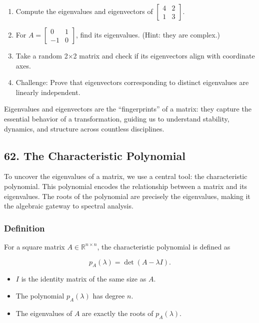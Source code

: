 \documentclass[
  letterpaper,
  DIV=11,
  numbers=noendperiod]{scrreprt}
\providecommand{\tightlist}{%
  \setlength{\itemsep}{0pt}\setlength{\parskip}{0pt}}
\begin{document}
\begin{enumerate}
\def\labelenumi{\arabic{enumi}.}
\tightlist
\item
  Compute the eigenvalues and eigenvectors of
  \(\begin{bmatrix} 4 & 2 \\ 1 & 3 \end{bmatrix}\).
\item
  For \(A = \begin{bmatrix} 0 & 1 \\ -1 & 0 \end{bmatrix}\), find its
  eigenvalues. (Hint: they are complex.)
\item
  Take a random 2×2 matrix and check if its eigenvectors align with
  coordinate axes.
\item
  Challenge: Prove that eigenvectors corresponding to distinct
  eigenvalues are linearly independent.
\end{enumerate}

Eigenvalues and eigenvectors are the ``fingerprints'' of a matrix: they
capture the essential behavior of a transformation, guiding us to
understand stability, dynamics, and structure across countless
disciplines.

\subsection{62. The Characteristic
Polynomial}\label{the-characteristic-polynomial}

To uncover the eigenvalues of a matrix, we use a central tool: the
characteristic polynomial. This polynomial encodes the relationship
between a matrix and its eigenvalues. The roots of the polynomial are
precisely the eigenvalues, making it the algebraic gateway to spectral
analysis.

\subsubsection{Definition}\label{definition-3}

For a square matrix \(A \in \mathbb{R}^{n \times n}\), the
characteristic polynomial is defined as

\[
p_A(\lambda) = \det(A - \lambda I).
\]

\begin{itemize}
\tightlist
\item
  \(I\) is the identity matrix of the same size as \(A\).
\item
  The polynomial \(p_A(\lambda)\) has degree \(n\).
\item
  The eigenvalues of \(A\) are exactly the roots of \(p_A(\lambda)\).
\end{itemize}
\end{document}
